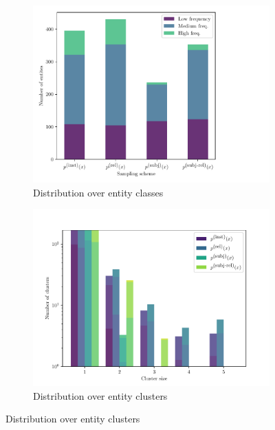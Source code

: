 \begin{figure}
  \centering
  \begin{subfigure}{0.7\textwidth}
    \includegraphics[width=\textwidth]{figures/analysis/selective_supervised_entity}
    \caption{\label{fig:kbpo:selective-supervised-entity} Distribution over entity classes}
  \end{subfigure}

  \begin{subfigure}{0.7\textwidth}
    \includegraphics[width=\textwidth]{figures/analysis/selective_supervised_clusters}
    \caption{\label{fig:kbpo:selective-supervised-clusters} Distribution over entity clusters}
  \end{subfigure}


\end{figure}
